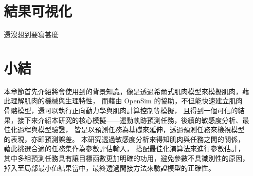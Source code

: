 
\section{結果可視化}
還沒想到要寫甚麼

\section{小結}
本章節首先介紹將會使用到的背景知識，像是透過希爾式肌肉模型來模擬肌肉，藉此理解肌肉的機械與生理特性，
而藉由 OpenSim 的協助，不但能快速建立肌肉骨骼模型，還可以執行正向動力學與肌肉計算控制等模擬，
且得到一個可信的結果，接下來介紹本研究的核心模擬——運動軌跡預測任務，後續的敏感度分析、最佳化過程與模型驗證，
皆是以預測任務為基礎來延伸，透過預測任務來檢視模型的表現，亦即預測誤差。
本研究透過敏感度分析來得知肌肉與任務之間的關係，藉此挑選合適的任務集作為參數評估輸入，
搭配最佳化演算法來進行參數估計，其中多組預測任務具有讓目標函數更加明確的功用，避免參數不具識別性的原因，
掉入至局部最小值結果當中，最終透過間接方法來驗證模型的正確性。

